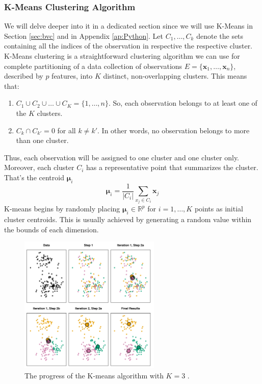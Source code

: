 
\subsubsection{K-Means Clustering Algorithm}
\label{sss:kmeans}
We will delve deeper into it in a dedicated section since we will use K-Means in Section \ref{sec:bvc} and in Appendix \ref{ap:Python}. Let $C_1,\dots,C_k$ denote the sets containing all the indices of the observation in respective the respective cluster. K-Means clustering is a straightforward clustering algorithm we can use for complete partitioning of a data collection of observations $E=\{\mathbf{x}_1, \dots, \mathbf{x}_n \}$, described by $p$ features, into $K$ distinct, non-overlapping clusters. This means that:
\begin{enumerate}
    \item $C_1 \cup C_2 \cup \dots \cup C_K=\{1,\dots,n\}$. So, each observation belongs to at least one of the $K$ clusters.
    \item $C_k\cap C_{k'}=0$ for all $k\neq k'$. In other words, no observation belongs to more than one cluster.
\end{enumerate}
Thus, each observation will be assigned to one cluster and one cluster only. Moreover, each cluster $C_i$ has a representative point that summarizes the cluster. That's the centroid $\bm{\mu}_i$
\begin{equation}
    \label{eq:centroid}
    \boldsymbol{\mu}_i=\frac{1}{\left|C_i\right|} \sum_{x_j \in C_i} \mathbf{x}_j
\end{equation}
K-means begins by randomly placing $\bm{\mu}_i \in \mathbb{R}^p$ for $i=1,\dots,K$ points as initial cluster centroids. This is usually achieved by generating a random value within the bounds of each dimension. 
\begin{figure}
    \centering
    \includegraphics[width=0.6\textwidth]{Images/clustiteration.png}
    \caption[K-Means clustering iterations.]{The progress of the K-means algorithm with $K=3$ \cite{james_introduction_2021}.}
    \label{fig:clustiteration}
\end{figure}
